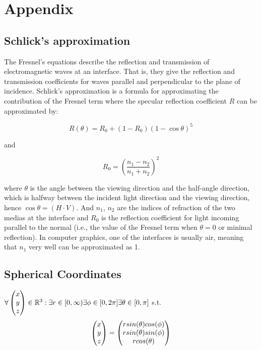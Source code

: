 \chapter{Appendix}
\section{Schlick's approximation}
The Fresnel's equations describe the reflection and transmission of electromagnetic waves at an interface. That is, they give the reflection and transmission coefficients for waves parallel and perpendicular to the plane of incidence. Schlick's approximation is a formula for approximating the contribution of the Fresnel term where the specular reflection coefficient $R$ can be approximated by:

\begin{equation}
 R(\theta) = R_0 + (1 - R_0)(1 - \cos \theta)^5
\label{eq:schlickapprox}
\end{equation}

and

\begin{equation*}
  R_0 = \left(\frac{n_1-n_2}{n_1+n_2}\right)^2
\end{equation*}

where $\theta$ is the angle between the viewing direction and the half-angle direction, which is halfway between the incident 
light direction and the viewing direction, hence $\cos\theta=(H\cdot V)$. And $n_1,\,n_2$ are the indices of refraction of the two medias at the interface and $R_0$ is the reflection coefficient for light incoming parallel to the normal (i.e., the value of the Fresnel term when $\theta = 0$ or minimal reflection). In computer graphics, one of the interfaces is usually air, meaning that $n_1$ very well can be approximated as 1.

\section{Spherical Coordinates}
\label{sec:sphericalcoordinates}
$\forall \colvec[x]{y}{z} \in \mathbb{R}^3 : \exists r \in [0,\infty) \exists \phi \in [0,2\pi] \exists \theta \in [0,\pi] $ s.t.
\begin{equation*}
\colvec[x]{y}{z} = \colvec[r sin(\theta)cos(\phi)]{r sin(\theta)sin(\phi)}{r cos(\theta)}
\label{eq:sphericalcoordinates}
\end{equation*}





